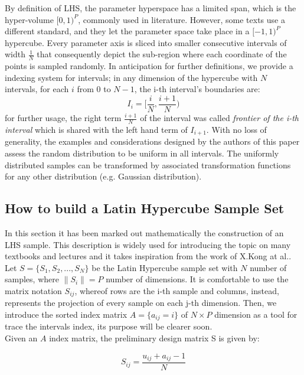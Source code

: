 \documentclass[12pt]{extarticle}
\begin{document}
By definition of LHS, the parameter hyperspace has a limited span, which is the hyper-volume $[0,1)^P$, commonly used in literature. However, some texts use a different standard, and they let the parameter space take place in a $[-1,1)^P$ hypercube. Every parameter axis is sliced into smaller consecutive intervals of width $\frac{1}{N}$ that consequently depict the sub-region where each coordinate of the points is sampled randomly. In anticipation for further definitions, we provide a indexing system for intervals; in any dimension of the hypercube with $N$ intervals, for each $i$ from 0 to $N-1$, the i-th interval's boundaries are:
\begin{equation}
\label{eq:interval_index}
I_i = \Big[\frac{i}{N}, \frac{i + 1}{N}\Big)
\end{equation}
for further usage, the right term $\frac{i + 1}{N}$ of the interval was called \textit{frontier of the i-th interval} which is shared with the left hand term of $I_{i+1}$. 
With no loss of generality, the examples and considerations designed by the authors of this paper assess the random distribution to be uniform in all intervals. The uniformly distributed samples can be transformed by associated transformation functions for any other distribution (e.g. Gaussian distribution).

\subsection{How to build a Latin Hypercube Sample Set}
\label{subsec:how_to_lhs}
In this section it has been marked out mathematically the construction of an LHS sample. This description is widely used for introducing the topic on many textbooks and lectures and it takes inspiration from the work of X.Kong at al..
Let $S = \{S_1, S_2, ..., S_N\}$ be the Latin Hypercube sample set with $N$ number of samples, where $\|S_i\| = P$ number of dimensions. It is comfortable to use the matrix notation $S_{ij}$, whereof rows are the i-th sample and columns, instead, represents the projection of every sample on each j-th dimension. Then, we introduce the sorted index matrix $A = \{a_{ij} = i\}$ of $N \times P$ dimension as a tool for trace the intervals index, its purpose will be clearer soon. \\
Given an $A$ index matrix, the preliminary design matrix S is given by: 

\begin{equation}
\label{eq:Sij_def}
S_{ij} = \frac{u_{ij} + a_{ij} - 1}{N}
\end{equation}
\end{document}
